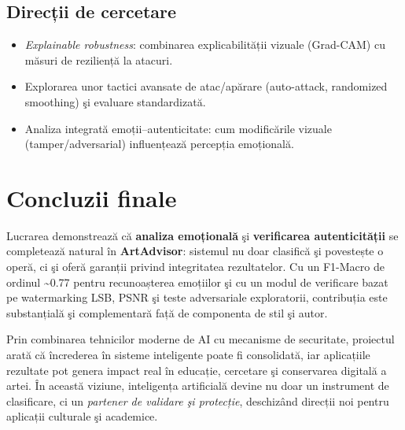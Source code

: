 \subsection*{Direcții de cercetare}
\begin{itemize}
  \item \emph{Explainable robustness}: combinarea explicabilității vizuale (Grad-CAM) cu măsuri de reziliență la atacuri.
  \item Explorarea unor tactici avansate de atac/apărare (auto-attack, randomized smoothing) şi evaluare standardizată.
  \item Analiza integrată emoții--autenticitate: cum modificările vizuale (tamper/adversarial) influențează percepția emoțională.
\end{itemize}

\section{Concluzii finale}
Lucrarea demonstrează că \textbf{analiza emoțională} şi \textbf{verificarea autenticității} se completează natural în \textbf{ArtAdvisor}: sistemul nu doar clasifică şi povestește o operă, ci şi oferă garanții privind integritatea rezultatelor. Cu un F1-Macro de ordinul \textasciitilde 0.77 pentru recunoașterea emoțiilor şi cu un modul de verificare bazat pe watermarking LSB, PSNR şi teste adversariale exploratorii, contribuția este substanțială şi complementară față de componenta de stil şi autor. 

Prin combinarea tehnicilor moderne de AI cu mecanisme de securitate, proiectul arată că încrederea în sisteme inteligente poate fi consolidată, iar aplicațiile rezultate pot genera impact real în educație, cercetare şi conservarea digitală a artei. În această viziune, inteligența artificială devine nu doar un instrument de clasificare, ci un \emph{partener de validare şi protecție}, deschizând direcții noi pentru aplicații culturale şi academice.